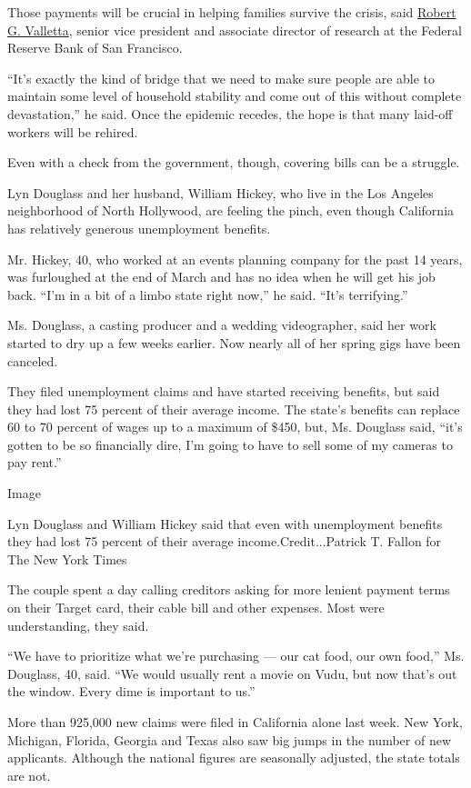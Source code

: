 Those payments will be crucial in helping families survive the crisis,
said
\href{https://www.frbsf.org/economic-research/economists/robert-valletta/}{Robert
G. Valletta}, senior vice president and associate director of research
at the Federal Reserve Bank of San Francisco.

``It's exactly the kind of bridge that we need to make sure people are
able to maintain some level of household stability and come out of this
without complete devastation,'' he said. Once the epidemic recedes, the
hope is that many laid-off workers will be rehired.

Even with a check from the government, though, covering bills can be a
struggle.

Lyn Douglass and her husband, William Hickey, who live in the Los
Angeles neighborhood of North Hollywood, are feeling the pinch, even
though California has relatively generous unemployment benefits.

Mr. Hickey, 40, who worked at an events planning company for the past 14
years, was furloughed at the end of March and has no idea when he will
get his job back. ``I'm in a bit of a limbo state right now,'' he said.
``It's terrifying.''

Ms. Douglass, a casting producer and a wedding videographer, said her
work started to dry up a few weeks earlier. Now nearly all of her spring
gigs have been canceled.

They filed unemployment claims and have started receiving benefits, but
said they had lost 75 percent of their average income. The state's
benefits can replace 60 to 70 percent of wages up to a maximum of \$450,
but, Ms. Douglass said, ``it's gotten to be so financially dire, I'm
going to have to sell some of my cameras to pay rent.''

Image

Lyn Douglass and William Hickey said that even with unemployment
benefits they had lost 75 percent of their average
income.Credit...Patrick T. Fallon for The New York Times

The couple spent a day calling creditors asking for more lenient payment
terms on their Target card, their cable bill and other expenses. Most
were understanding, they said.

``We have to prioritize what we're purchasing --- our cat food, our own
food,'' Ms. Douglass, 40, said. ``We would usually rent a movie on Vudu,
but now that's out the window. Every dime is important to us.''

More than 925,000 new claims were filed in California alone last week.
New York, Michigan, Florida, Georgia and Texas also saw big jumps in the
number of new applicants. Although the national figures are seasonally
adjusted, the state totals are not.

